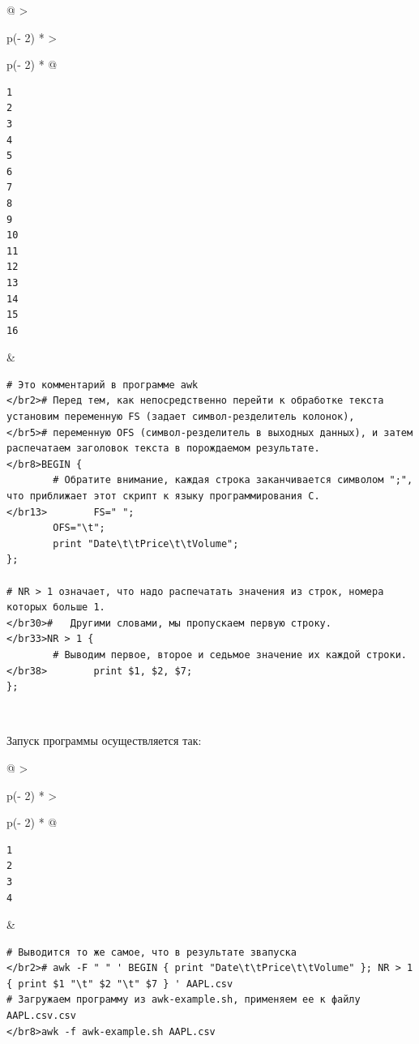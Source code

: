 \documentclass{article}
\begin{document}
\begin{longtable}[]{@{}
  >{\raggedright\arraybackslash}p{(\columnwidth - 2\tabcolsep) * }
  >{\raggedright\arraybackslash}p{(\columnwidth - 2\tabcolsep) * }@{}}
\toprule
\endhead
\begin{minipage}[t]{\linewidth}\raggedright
\begin{verbatim}
1
2
3
4
5
6
7
8
9
10
11
12
13
14
15
16
\end{verbatim}
\end{minipage} & \begin{minipage}[t]{\linewidth}\raggedright
\begin{verbatim}
# Это комментарий в программе awk
</br2># Перед тем, как непосредственно перейти к обработке текста установим переменную FS (задает символ-резделитель колонок),
</br5># переменную OFS (символ-резделитель в выходных данных), и затем распечатаем заголовок текста в порождаемом результате.
</br8>BEGIN {
        # Обратите внимание, каждая строка заканчивается символом ";", что приближает этот скрипт к языку программирования C.
</br13>        FS=" ";
        OFS="\t";
        print "Date\t\tPrice\t\tVolume";
};

# NR > 1 означает, что надо распечатать значения из строк, номера которых больше 1.
</br30>#   Другими словами, мы пропускаем первую строку.
</br33>NR > 1 {
        # Выводим первое, второе и седьмое значение их каждой строки.
</br38>        print $1, $2, $7;
};
\end{verbatim}
\end{minipage} \\ \addlinespace
\bottomrule
\end{longtable}

Запуск программы осуществляется так:

\begin{longtable}[]{@{}
  >{\raggedright\arraybackslash}p{(\columnwidth - 2\tabcolsep) * }
  >{\raggedright\arraybackslash}p{(\columnwidth - 2\tabcolsep) * }@{}}
\toprule
\endhead
\begin{minipage}[t]{\linewidth}\raggedright
\begin{verbatim}
1
2
3
4
\end{verbatim}
\end{minipage} & \begin{minipage}[t]{\linewidth}\raggedright
\begin{verbatim}
# Выводится то же самое, что в результате звапуска
</br2># awk -F " " ' BEGIN { print "Date\t\tPrice\t\tVolume" }; NR > 1 { print $1 "\t" $2 "\t" $7 } ' AAPL.csv
# Загружаем программу из awk-example.sh, применяем ее к файлу AAPL.csv.csv
</br8>awk -f awk-example.sh AAPL.csv
\end{verbatim}
\end{minipage} \\ \addlinespace
\bottomrule
\end{longtable}
\end{document}
